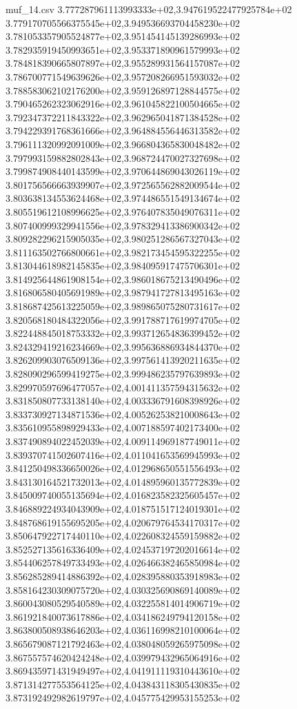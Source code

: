 \begin{filecontents*}{muf_14.csv}
3.777287961113993333e+02,3.947619522477925784e+02
3.779170705566375545e+02,3.949536693704458230e+02
3.781053357905524877e+02,3.951454145139286993e+02
3.782935919450993651e+02,3.953371890961579993e+02
3.784818390665807897e+02,3.955289931564157087e+02
3.786700771549639626e+02,3.957208266951593032e+02
3.788583062102176200e+02,3.959126897128844575e+02
3.790465262323062916e+02,3.961045822100504665e+02
3.792347372211843322e+02,3.962965041871384528e+02
3.794229391768361666e+02,3.964884556446313582e+02
3.796111320992091009e+02,3.966804365830048482e+02
3.797993159882802843e+02,3.968724470027327698e+02
3.799874908440143599e+02,3.970644869043026119e+02
3.801756566663939907e+02,3.972565562882009544e+02
3.803638134553624468e+02,3.974486551549134674e+02
3.805519612108996625e+02,3.976407835049076311e+02
3.807400999329941556e+02,3.978329413386900342e+02
3.809282296215905035e+02,3.980251286567327043e+02
3.811163502766800661e+02,3.982173454595322255e+02
3.813044618982145835e+02,3.984095917475706301e+02
3.814925644861908154e+02,3.986018675213490496e+02
3.816806580405691989e+02,3.987941727813495163e+02
3.818687425613225059e+02,3.989865075280731617e+02
3.820568180484322056e+02,3.991788717619974705e+02
3.822448845018753332e+02,3.993712654836399452e+02
3.824329419216234669e+02,3.995636886934844370e+02
3.826209903076509136e+02,3.997561413920211635e+02
3.828090296599419275e+02,3.999486235797639893e+02
3.829970597696477057e+02,4.001411357594315632e+02
3.831850807733138140e+02,4.003336791608398926e+02
3.833730927134871536e+02,4.005262538210008643e+02
3.835610955898929433e+02,4.007188597402173400e+02
3.837490894022452039e+02,4.009114969187749011e+02
3.839370741502607416e+02,4.011041653569945993e+02
3.841250498336650026e+02,4.012968650551556493e+02
3.843130164521732013e+02,4.014895960135772839e+02
3.845009740055135694e+02,4.016823582325605457e+02
3.846889224934043909e+02,4.018751517124019301e+02
3.848768619155695205e+02,4.020679764534170317e+02
3.850647922717440110e+02,4.022608324559159882e+02
3.852527135616336409e+02,4.024537197202016614e+02
3.854406257849733493e+02,4.026466382465850984e+02
3.856285289414886392e+02,4.028395880353918983e+02
3.858164230309075720e+02,4.030325690869140089e+02
3.860043080529540589e+02,4.032255814014906719e+02
3.861921840073617886e+02,4.034186249794120158e+02
3.863800508938646203e+02,4.036116998210100064e+02
3.865679087121792463e+02,4.038048059265975098e+02
3.867557574620424248e+02,4.039979432965064916e+02
3.869435971431949497e+02,4.041911119310443610e+02
3.871314277553564125e+02,4.043843118305430835e+02
3.873192492982619797e+02,4.045775429953155253e+02

\end{filecontents*}
